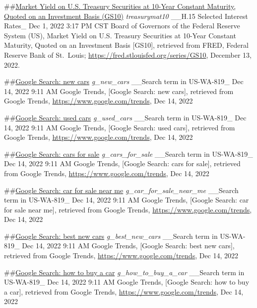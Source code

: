 \documentclass[
]{article}
\begin{document}
\#\#\href{https://fred.stlouisfed.org/series/GS10}{Market Yield on U.S.
Treasury Securities at 10-Year Constant Maturity, Quoted on an
Investment Basis (GS10)} \emph{treasurymat10} \_\_H.15 Selected Interest
Rates\_ Dec 1, 2022 3:17 PM CST Board of Governors of the Federal
Reserve System (US), Market Yield on U.S. Treasury Securities at 10-Year
Constant Maturity, Quoted on an Investment Basis {[}GS10{]}, retrieved
from FRED, Federal Reserve Bank of St.~Louis;
\url{https://fred.stlouisfed.org/series/GS10}, December 13, 2022.

\#\#\href{https://trends.google.com/trends/explore?q=new\%20cars\&geo=US-WA-819}{Google
Search: new cars} \emph{g\_new\_cars} \_\_Search term in US-WA-819\_ Dec
14, 2022 9:11 AM Google Trends, {[}Google Search: new cars{]}, retrieved
from Google Trends, \url{https://www.google.com/trends}, Dec 14, 2022

\#\#\href{https://trends.google.com/trends/explore?q=used\%20cars\&geo=US-WA-819}{Google
Search: used cars} \emph{g\_used\_cars} \_\_Search term in US-WA-819\_
Dec 14, 2022 9:11 AM Google Trends, {[}Google Search: used cars{]},
retrieved from Google Trends, \url{https://www.google.com/trends}, Dec
14, 2022

\#\#\href{https://trends.google.com/trends/explore?q=cars\%20for\%20sale\&geo=US-WA-819}{Google
Search: cars for sale} \emph{g\_cars\_for\_sale} \_\_Search term in
US-WA-819\_ Dec 14, 2022 9:11 AM Google Trends, {[}Google Search: cars
for sale{]}, retrieved from Google Trends,
\url{https://www.google.com/trends}, Dec 14, 2022

\#\#\href{https://trends.google.com/trends/explore?q=car\%20for\%20sale\%20near\%20me\&geo=US-WA-819}{Google
Search: car for sale near me} \emph{g\_car\_for\_sale\_near\_me}
\_\_Search term in US-WA-819\_ Dec 14, 2022 9:11 AM Google Trends,
{[}Google Search: car for sale near me{]}, retrieved from Google Trends,
\url{https://www.google.com/trends}, Dec 14, 2022

\#\#\href{https://trends.google.com/trends/explore?q=best\%20new\%20cars\&geo=US-WA-819}{Google
Search: best new cars} \emph{g\_best\_new\_cars} \_\_Search term in
US-WA-819\_ Dec 14, 2022 9:11 AM Google Trends, {[}Google Search: best
new cars{]}, retrieved from Google Trends,
\url{https://www.google.com/trends}, Dec 14, 2022

\#\#\href{https://trends.google.com/trends/explore?q=how\%20to\%20buy\%20a\%20car\&geo=US-WA-819}{Google
Search: how to buy a car} \emph{g\_how\_to\_buy\_a\_car} \_\_Search term
in US-WA-819\_ Dec 14, 2022 9:11 AM Google Trends, {[}Google Search: how
to buy a car{]}, retrieved from Google Trends,
\url{https://www.google.com/trends}, Dec 14, 2022
\end{document}
